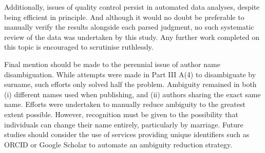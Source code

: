 Additionally, issues of quality control persist in automated data analyses, despite being efficient in principle. And although it would no doubt be preferable to manually verify the results alongside each parsed judgment, no such systematic review of the data was undertaken by this study. Any further work completed on this topic is encouraged to scrutinise ruthlessly.

Final mention should be made to the perennial issue of author name disambiguation. While attempts were made in Part III A(4) to disambiguate by surname, such efforts only solved half the problem. Ambiguity remained in both (i) different names used when publishing, and (ii) authors sharing the exact same name. Efforts were undertaken to manually reduce ambiguity to the greatest extent possible. However, recognition must be given to the possibility that individuals can change their name entirely, particularly by marriage. Future studies should consider the use of services providing unique identifiers such as ORCID or Google Scholar to automate an ambiguity reduction strategy.

